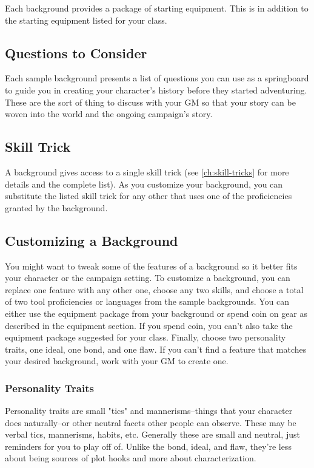 Each background provides a package of starting equipment. This is in addition to the starting equipment listed for your class.

\subsection{Questions to Consider}
Each sample background presents a list of questions you can use as a springboard to guide you in creating your character's history before they started adventuring. These are the sort of thing to discuss with your GM so that your story can be woven into the world and the ongoing campaign's story.

\subsection{Skill Trick}

A background gives access to a single skill trick (see \ref{ch:skill-tricks} for more details and the complete list). As you customize your background, you can substitute the listed skill trick for any other that uses one of the proficiencies granted by the background.

\subsection{Customizing a Background} 

You might want to tweak some of the features of a background so it better fits your character or the campaign setting. To customize a background, you can replace one feature with any other one, choose any two skills, and choose a total of two tool proficiencies or languages from the sample backgrounds. You can either use the equipment package from your background or spend coin on gear as described in the equipment section. If you spend coin, you can't also take the equipment package suggested for your class. Finally, choose two personality traits, one ideal, one bond, and one flaw. If you can't find a feature that matches your desired background, work with your GM to create one.

\subsubsection{Personality Traits}
Personality traits are small "tics" and mannerisms--things that your character does naturally--or other neutral facets other people can observe. These may be verbal tics, mannerisms, habits, etc. Generally these are small and neutral, just reminders for you to play off of. Unlike the bond, ideal, and flaw, they're less about being sources of plot hooks and more about characterization.


